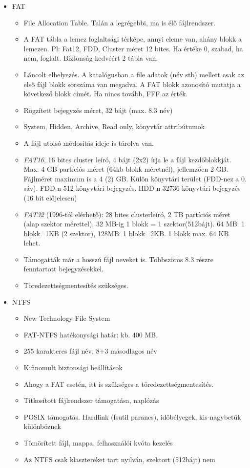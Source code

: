 \documentclass[margin=0px]{article}
\begin{document}
\begin{itemize}
    \item FAT
          \begin{itemize}
              \item File Allocation Table. Talán a legrégebbi, ma is élő fájlrendszer.
              \item A FAT tábla a lemez foglaltsági térképe, annyi eleme van, ahány blokk a lemezen. Pl: Fat12, FDD, Cluster méret 12 bites. Ha értéke 0, szabad, ha nem, foglalt. Biztonság kedvéért 2 tábla van.
              \item Láncolt elhelyezés. A katalógusban a file adatok (név stb) mellett csak az első fájl blokk sorszáma van megadva. A FAT blokk azonosító mutatja a következő blokk címét. Ha nincs tovább, FFF az érték.
              \item Rögzített bejegyzés méret, 32 bájt (max. 8.3 név)
              \item System, Hidden, Archive, Read only, könyvtár attribútumok
              \item A fájl utolsó módosítás ideje is tárolva van.
              \item \textit{FAT16}, 16 bites cluster leíró, 4 bájt (2x2) írja le a fájl kezdőblokkját. Max. 4 GB partíciós méret (64kb blokk méretnél), jellemzően 2 GB. Fájlméret maximum is a 4 (2) GB. Külön könyvtári terület (FDD-nez a 0. sáv). FDD-n 512 könyvtári bejegyzés. HDD-n 32736 könyvtári bejegyzés (16 bit előjelesen)
              \item \textit{FAT32} (1996-tól elérhető): 28 bites clusterleíró, 2 TB partíciós méret (alap szektor mérettel), 32 MB-ig 1 blokk = 1 szektor(512bájt). 64 MB: 1 blokk=1KB (2 szektor), 128MB: 1 blokk=2KB. 1 blokk max. 64 KB lehet.
              \item Támogatták már a hosszú fájl neveket is. Többszörös 8.3 részre fenntartott bejegyzésekkel.
              \item Töredezettségmentesítés szükséges.
          \end{itemize}
    \item NTFS
          \begin{itemize}
              \item New Technology File System
              \item FAT-NTFS hatékonysági határ: kb. 400 MB.
              \item 255 karakteres fájl név, 8+3 másodlagos név
              \item Kifinomult biztonsági beállítások
              \item Ahogy a FAT esetén, itt is szükséges a töredezettségmentesítés.
              \item Titkosított fájlrendszer támogatása, naplózás
              \item POSIX támogatás. Hardlink (fsutil parancs), időbélyegek, kis-nagybetűk különböznek
              \item Tömörített fájl, mappa, felhasználói kvóta kezelés
              \item Az NTFS csak klasztereket tart nyilván, szektort (512bájt) nem


\end{itemize}
\end{itemize}
\end{document}
